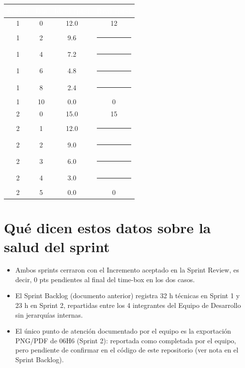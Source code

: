 \documentclass[11pt]{article}
\begin{document}
\begin{center}
\renewcommand{\arraystretch}{1.2}
\begin{tabular}{|c|c|c|c|}
\hline
\rowcolor{epnblue}
\textcolor{white}{\textbf{Sprint}} & \textcolor{white}{\textbf{Día}} & \textcolor{white}{\textbf{Ideal (pts)}} & \textcolor{white}{\textbf{Real (pts)}} \\
\hline
1 & 0 & 12.0 & 12 \\
\hline
1 & 2 & 9.6 & \rule{1.2cm}{0.4pt} \\
\hline
1 & 4 & 7.2 & \rule{1.2cm}{0.4pt} \\
\hline
1 & 6 & 4.8 & \rule{1.2cm}{0.4pt} \\
\hline
1 & 8 & 2.4 & \rule{1.2cm}{0.4pt} \\
\hline
1 & 10 & 0.0 & 0 \\
\hline
2 & 0 & 15.0 & 15 \\
\hline
2 & 1 & 12.0 & \rule{1.2cm}{0.4pt} \\
\hline
2 & 2 & 9.0 & \rule{1.2cm}{0.4pt} \\
\hline
2 & 3 & 6.0 & \rule{1.2cm}{0.4pt} \\
\hline
2 & 4 & 3.0 & \rule{1.2cm}{0.4pt} \\
\hline
2 & 5 & 0.0 & 0 \\
\hline
\end{tabular}
\end{center}

\section{Qué dicen estos datos sobre la salud del sprint}
\begin{itemize}[leftmargin=1.4cm]
  \item Ambos sprints cerraron con el Incremento aceptado en la Sprint Review, es decir, 0 pts
        pendientes al final del time-box en los dos casos.
  \item El Sprint Backlog (documento anterior) registra 32 h técnicas en Sprint 1 y 23 h en Sprint 2,
        repartidas entre los 4 integrantes del Equipo de Desarrollo sin jerarquías internas.
  \item El único punto de atención documentado por el equipo es la exportación PNG/PDF de 06H6
        (Sprint 2): reportada como completada por el equipo, pero pendiente de confirmar en el código
        de este repositorio (ver nota en el Sprint Backlog).
\end{itemize}
\end{document}

